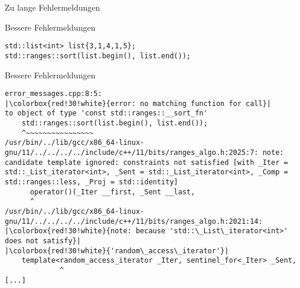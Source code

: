 \begin{frame}[fragile]{Zu lange Fehlermeldungen}

\end{frame}

\begin{frame}[fragile]{Bessere Fehlermeldungen}

    \begin{verbatim}
std::list<int> list{3,1,4,1,5};
std::ranges::sort(list.begin(), list.end());
    \end{verbatim}
\end{frame}

\begin{frame}[fragile]{Bessere Fehlermeldungen}

\begin{verbatim}
error_messages.cpp:8:5:
|\colorbox{red!30!white}{error: no matching function for call}|
to object of type 'const std::ranges::__sort_fn'
    std::ranges::sort(list.begin(), list.end());
    ^~~~~~~~~~~~~~~~~
/usr/bin/../lib/gcc/x86_64-linux-gnu/11/../../../../include/c++/11/bits/ranges_algo.h:2025:7: note: candidate template ignored: constraints not satisfied [with _Iter = std::_List_iterator<int>, _Sent = std::_List_iterator<int>, _Comp = std::ranges::less, _Proj = std::identity]
      operator()(_Iter __first, _Sent __last,
      ^
/usr/bin/../lib/gcc/x86_64-linux-gnu/11/../../../../include/c++/11/bits/ranges_algo.h:2021:14:
|\colorbox{red!30!white}{note: because 'std::\_List\_iterator<int>' does not satisfy}|
|\colorbox{red!30!white}{'random\_access\_iterator'}|
    template<random_access_iterator _Iter, sentinel_for<_Iter> _Sent,
             ^
[...]
\end{verbatim}

\end{frame}